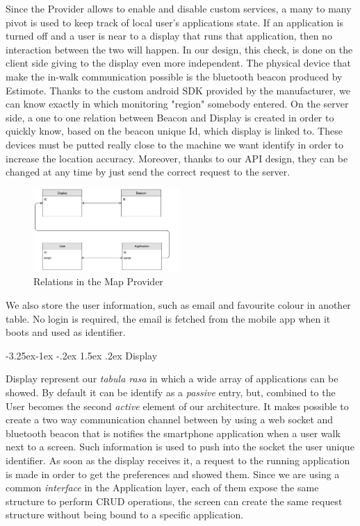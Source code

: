 \documentclass[]{usiinfbachelorproject}
\makeatletter
\newcommand\subsubsection{\@startsection{subsubsection}{3}{\z@}%
                {-3.25ex\@plus -1ex \@minus -.2ex}%
                {1.5ex \@plus .2ex}%
                {\normalfont\normalsize\bfseries}}
\makeatother
\begin{document}
Since the Provider allows to enable and disable custom services, a many to many pivot is used to keep track of local user's applications state. If an application is turned off and a user is near to a display that runs that application, then no interaction between the two will happen. In our design, this check, is done on the client side giving to the display even more independent.
The physical device that make the in-walk communication possible is the bluetooth beacon produced by Estimote. Thanks to the custom android SDK provided by the manufacturer, we can know exactly in which monitoring "region" somebody entered. On the server side, a one to one relation between Beacon and Display is created in order to quickly know, based on the beacon unique Id, which display is linked to. These devices must be putted really close to the machine we want identify in order to increase the location accuracy. Moreover, thanks to our API design, they can be changed at any time by just send the correct request to the server.

\begin{figure}[H]
  \centering
  \includegraphics[width=0.5\textwidth]{./images/TacitaRelations.jpg}
   \caption{Relations in the Map Provider}

\end{figure} 



We also store the user information, such as email and favourite colour in another table. No login is required, the email is fetched from the mobile app when it boots and used as identifier. 

\subsubsection{Display}

Display represent our \emph{tabula rasa} in which a wide array of applications can be showed. By default it can be identify as a \emph{passive} entry, but, combined to the User becomes the second \emph{active} element of our architecture. It makes possible to create a two way communication channel between by using a web socket and bluetooth beacon that is notifies the smartphone application when a user walk next to a screen. Such information is used to push into the socket the user unique identifier. As soon as the display receives it, a request to the running application is made in order to get the preferences and showed them. Since we are using a common \emph{interface} in the Application layer, each of them expose the same structure to perform CRUD operations, the screen can create the same request structure without being bound to a specific application.
\end{document}
